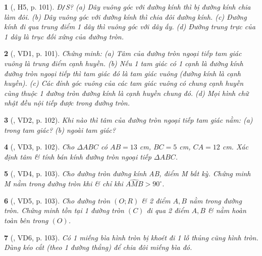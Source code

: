 \documentclass{article}
\newtheorem{baitoan}{}
\begin{document}
\begin{baitoan}[\cite{Binh_boi_duong_Toan_9_tap_1}, H5, p. 101]
	{\rm Đ{\tt/}S?} (a) Dây vuông góc với đường kính thì bị đường kính chia làm đôi. (b) Dây vuông góc với đường kính thì chia đôi đường kính. (c) Đường kính đi qua trung điểm 1 dây thì vuông góc với dây ấy. (d) Đường trung trực của 1 dây là trục đối xứng của đường tròn.
\end{baitoan}

\begin{baitoan}[\cite{Binh_boi_duong_Toan_9_tap_1}, VD1, p. 101]
	Chứng minh: (a) Tâm của đường tròn ngoại tiếp tam giác vuông là trung điểm cạnh huyền. (b) Nếu 1 tam giác có 1 cạnh là đường kính đường tròn ngoại tiếp thì tam giác đó là tam giác vuông (đường kính là cạnh huyền). (c) Các đỉnh góc vuông của các tam giác vuông có chung cạnh huyền cùng thuộc 1 đường tròn đường kính là cạnh huyền chung đó. (d) Mọi hình chữ nhật đều nội tiếp được trong đường tròn.
\end{baitoan}

\begin{baitoan}[\cite{Binh_boi_duong_Toan_9_tap_1}, VD2, p. 102]
	Khi nào thì tâm của đường tròn ngoại tiếp tam giác nằm: (a) trong tam giác? (b) ngoài tam giác?
\end{baitoan}

\begin{baitoan}[\cite{Binh_boi_duong_Toan_9_tap_1}, VD3, p. 102]
	Cho $\Delta ABC$ có $AB = 13$ {\rm cm}, $BC = 5$ {\rm cm}, $CA = 12$ {\rm cm}. Xác định tâm \& tính bán kính đường tròn ngoại tiếp $\Delta ABC$.
\end{baitoan}

\begin{baitoan}[\cite{Binh_boi_duong_Toan_9_tap_1}, VD4, p. 103]
	Cho đường tròn đường kính AB, điểm M bất kỳ. Chứng minh M nằm trong đường tròn khi \& chỉ khi $\widehat{AMB} > 90^\circ$.
\end{baitoan}

\begin{baitoan}[\cite{Binh_boi_duong_Toan_9_tap_1}, VD5, p. 103]
	Cho đường tròn $(O;R)$ \& 2 điểm $A,B$ nằm trong đường tròn. Chứng minh tồn tại 1 đường tròn $(C)$ đi qua 2 điểm $A,B$ \& nằm hoàn toàn bên trong $(O)$.
\end{baitoan}

\begin{baitoan}[\cite{Binh_boi_duong_Toan_9_tap_1}, VD6, p. 103]
	Có 1 miếng bìa hình tròn bị khoét đi 1 lỗ thủng cũng hình tròn. Dùng kéo cắt (theo 1 đường thẳng) để chia đôi miếng bìa đó.
\end{baitoan}
\end{document}
